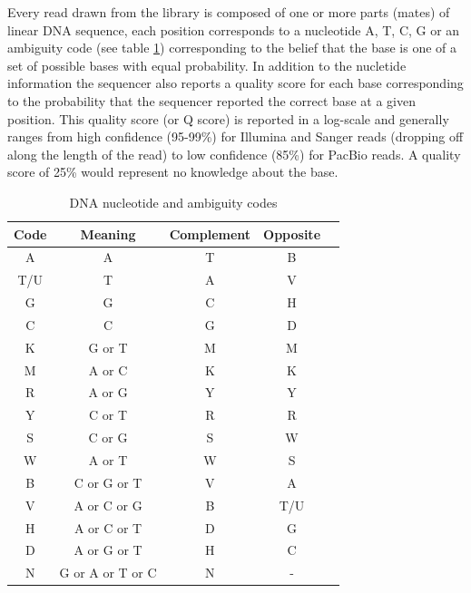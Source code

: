 \documentclass[phd,tocprelim]{cornell}
\begin{document}
Every read drawn from the library is composed of one or more parts (mates) of linear DNA sequence, each position corresponds to a nucleotide {\color{red} A}, {\color{blue} T}, {\color{MyDarkGreen} C}, {\color{orange} G} or an ambiguity code (see table \ref{ambcodes}) corresponding to the belief that the base is one of a set of possible bases with equal probability. In addition to the nucletide information the sequencer also reports a quality score for each base corresponding to the probability that the sequencer reported the correct base at a given position. This quality score (or Q score) is reported in a log-scale and generally ranges from high confidence (95-99\%) for Illumina and Sanger reads (dropping off along the length of the read) to low confidence (85\%) for PacBio reads. A quality score of 25\% would represent no knowledge about the base.

\begin{table}[htp]
\caption{DNA nucleotide and ambiguity codes}
\label{ambcodes}
\begin{center}
    \begin{tabular}{c|c|c|c|c}
        Code & Meaning & Complement & Opposite \\
        \hline
        {\color{red} A} & {\color{red} A} & {\color{blue} T} & B \\
        {\color{blue} T}/U & {\color{blue} T} & {\color{red} A} & V \\
        {\color{orange} G} & {\color{orange} G} & {\color{MyDarkGreen} C} & H \\
        {\color{MyDarkGreen} C} & {\color{MyDarkGreen} C} & {\color{orange} G} & D \\
        K & {\color{orange} G} or {\color{blue} T} & M & M \\
        M & {\color{red} A} or {\color{MyDarkGreen} C} & K & K \\
        R & {\color{red} A} or {\color{orange} G} & Y & Y \\
        Y & {\color{MyDarkGreen} C} or {\color{blue} T} & R & R \\
        S & {\color{MyDarkGreen} C} or {\color{orange} G} & S & W \\
        W & {\color{red} A} or {\color{blue} T} & W & S \\
        B & {\color{MyDarkGreen} C} or {\color{orange} G} or {\color{blue} T} & V & {\color{red} A} \\
        V & {\color{red} A} or {\color{MyDarkGreen} C} or {\color{orange} G} & B & {\color{blue} T}/U \\
        H & {\color{red} A} or {\color{MyDarkGreen} C} or {\color{blue} T} & D & {\color{orange} G} \\
        D & {\color{red} A} or {\color{orange} G} or {\color{blue} T} & H & {\color{MyDarkGreen} C} \\
        N & {\color{orange} G} or {\color{red} A} or {\color{blue} T} or {\color{MyDarkGreen} C} & N & -
    \end{tabular}\
\end{center}
\end{table}
\end{document}
